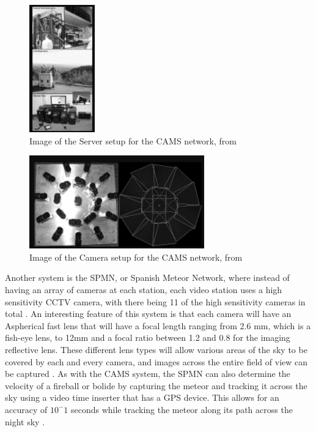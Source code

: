 \begin{figure}
    \centering
    \includegraphics[scale=1.5]{CAMS-Server-Setup.png}
    \caption{Image of the Server setup for the CAMS network, from \cite{jenniskens}}
    \label{Figure 4}
\end{figure}

\begin{figure}
    \centering
    \includegraphics[scale=1.5]{CAMS-Camera-Setup.png}
    \caption{Image of the Camera setup for the CAMS network, from \cite{jenniskens}}
    \label{Figure 5}
\end{figure}

Another system is the SPMN, or Spanish Meteor Network, where instead of having an array of cameras at each station, each video station uses a high sensitivity CCTV camera, with there being 11 of the high sensitivity cameras in total \cite{SPMN}. 
An interesting feature of this system is that each camera will have an Aspherical fast lens that will have a focal length ranging from 2.6 mm, which is a fish-eye lens, to 12mm and a focal ratio between 1.2 and 0.8 for the imaging reflective lens. 
These different lens types will allow various areas of the sky to be covered by each and every camera, and images across the entire field of view can be captured \cite{SPMN}.
As with the CAMS system, the SPMN can also determine the velocity of a fireball or bolide by capturing the meteor and tracking it across the sky using a video time inserter that has a GPS device. 
This allows for an accuracy of $10^-1$ seconds while tracking the meteor along its path across the night sky \cite{SPMN}.

